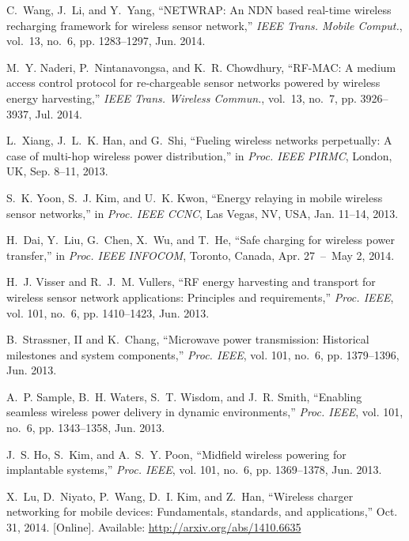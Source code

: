\documentclass[11pt,draftclsnofoot,journal,onecolumn]{IEEEtran}
\begin{document}
\begin{thebibliography}{10}
{
C.~{Wang}, J.~{Li}, and Y.~{Yang}, ``{NETWRAP}: An {NDN} based real-time
  wireless recharging framework for wireless sensor network,'' \emph{{IEEE}
  Trans. Mobile Comput.}, vol.~13, no.~6, pp. 1283--1297, Jun. 2014.

M.~Y. {Naderi}, P.~{Nintanavongsa}, and K.~R. {Chowdhury}, ``{RF-MAC}: A medium
  access control protocol for re-chargeable sensor networks powered by wireless
  energy harvesting,'' \emph{{IEEE} Trans. Wireless Commun.}, vol.~13, no.~7,
  pp. 3926--3937, Jul. 2014.

L.~{Xiang}, J.~L.~K. {Han}, and G.~{Shi}, ``Fueling wireless networks
  perpetually: A case of multi-hop wireless power distribution,'' in
  \emph{Proc. IEEE PIRMC}, London, UK, Sep. 8--11, 2013.

S.~K. {Yoon}, S.~J. {Kim}, and U.~K. {Kwon}, ``Energy relaying in mobile
  wireless sensor networks,'' in \emph{Proc. IEEE CCNC}, Las Vegas, NV, USA,
  Jan. 11--14, 2013.

H.~{Dai}, Y.~{Liu}, G.~{Chen}, X.~{Wu}, and T.~{He}, ``Safe charging for
  wireless power transfer,'' in \emph{Proc. IEEE INFOCOM}, Toronto, Canada,
  Apr. 27~--~May 2, 2014.

H.~J. {Visser} and R.~J.~M. {Vullers}, ``{RF} energy harvesting and transport
  for wireless sensor network applications: Principles and requirements,''
  \emph{Proc. {IEEE}}, vol. 101, no.~6, pp. 1410--1423, Jun. 2013.

B.~{Strassner, II} and K.~{Chang}, ``Microwave power transmission: Historical
  milestones and system components,'' \emph{Proc. {IEEE}}, vol. 101, no.~6, pp.
  1379--1396, Jun. 2013.

A.~P. {Sample}, B.~H. {Waters}, S.~T. {Wisdom}, and J.~R. {Smith}, ``Enabling
  seamless wireless power delivery in dynamic environments,'' \emph{Proc.
  {IEEE}}, vol. 101, no.~6, pp. 1343--1358, Jun. 2013.

J.~S. {Ho}, S.~{Kim}, and A.~S.~Y. {Poon}, ``Midfield wireless powering for
  implantable systems,'' \emph{Proc. {IEEE}}, vol. 101, no.~6, pp. 1369--1378,
  Jun. 2013.

\BIBentryALTinterwordspacing
X.~{Lu}, D.~{Niyato}, P.~{Wang}, D.~I. {Kim}, and Z.~{Han}, ``Wireless charger
  networking for mobile devices: Fundamentals, standards, and applications,''
  Oct. 31, 2014. [Online]. Available: \url{http://arxiv.org/abs/1410.6635}
\BIBentrySTDinterwordspacing

}
\end{thebibliography}
\end{document}

